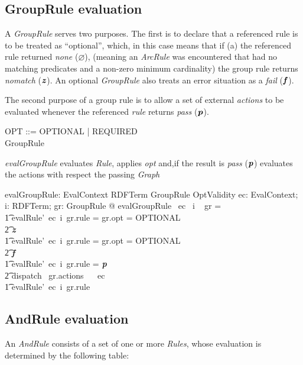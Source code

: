 \documentclass[fuzz]{llncs}
\def\pass{\textbf{\textit{p}}}
\def\fail{\textbf{\textit{f}}}
\def\none{\varnothing}
\def\error{\varepsilon}
\def\nomatch{\textbf{\textit{z}}}
\def\zc{\textit}
\begin{document}
\subsection{GroupRule evaluation}
A \zc{GroupRule} serves two purposes.  The first is to declare that a referenced rule is to be
treated as ``optional'', which, in this case means that if (a) the referenced rule returned
\zc{none} ($\none$), (meaning an \zc{ArcRule} was encountered that had no matching
predicates and a non-zero minimum cardinality) the group rule returns \zc{nomatch} 
($\nomatch$).  An optional \zc{GroupRule} also treats an error situation as a \zc{fail} 
($\fail$).

The second purpose of a group rule is to allow a set of external \zc{actions} to be evaluated
whenever the referenced \zc{rule} returns \zc{pass} ($\pass$). 


\begin{zed}
OPT ::= OPTIONAL | REQUIRED \\
GroupRule  \\
\end{zed}
\zc{evalGroupRule} evaluates \zc{Rule}, applies \zc{opt} and,if the result is \zc{pass} ($\pass$) evaluates the actions with respect the passing \zc{Graph} 
\begin{axdef}
   evalGroupRule: EvalContext \fun RDFTerm \fun GroupRule \fun OptValidity
\where
   \forall ec: EvalContext; i: RDFTerm; gr: GroupRule @ evalGroupRule~ ec~ i ~ gr = \\
\t1 \IF evalRule'~ec~i~gr.rule = \none \land gr.opt = OPTIONAL \\
\t2 \THEN \nomatch \\
\t1 \ELSE \IF evalRule'~ec~i~gr.rule = \error \land gr.opt = OPTIONAL \\
\t2 \THEN \fail \\
\t1 \ELSE \IF evalRule'~ec~i~gr.rule = \pass \\
\t2 \THEN dispatch~ gr.actions~ \emptyset ~ ec \\
\t1 \ELSE evalRule'~ec~i~gr.rule
\end{axdef}

\subsection{AndRule evaluation}
An \zc{AndRule} consists of a set of one or more \zc{Rules}, whose evaluation is determined
by the following table: \\
\end{document}
